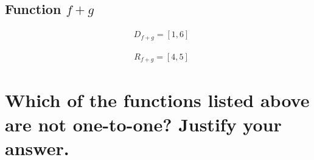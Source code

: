 \documentclass[12pt, letterpaper]{article}
\begin{document}
        \subsection{Function \(f+g\)}
        \vspace{-2pt}
        \begin{minipage}{0.5\textwidth}
            \begin{align*}
                & D_{f+g} = \left[1, 6\right]
            \end{align*}
        \end{minipage}
        \begin{minipage}{0.5\textwidth}
            \begin{align*}
                & R_{f+g} = \left[4, 5\right]
            \end{align*}
        \end{minipage}

    \newpage
    \section{Which of the functions listed above are not one-to-one? Justify your answer.}
\end{document}
